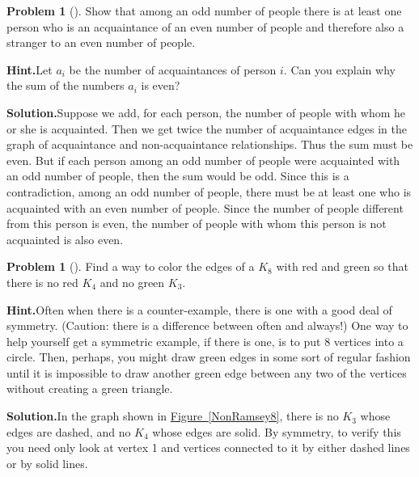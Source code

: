 \documentclass[10pt,]{book}
\theoremstyle{plain}
\theoremstyle{definition}
\newtheorem{activity}[project]{Problem}
\theoremstyle{definition}
\numberwithin{equation}{chapter}
\begin{document}
\begin{activity}[]\label{OddNoPeople}
Show that among an odd number of people there is at least one person who is an acquaintance of an even number of people and therefore also a stranger to an even number of people.%
\par\medskip\noindent%
\textbf{Hint.}\quad Let \(a_i\) be the number of acquaintances of person \(i\). Can you explain why the sum of the numbers \(a_i\) is even?%
\par\medskip\noindent%
\textbf{Solution.}\quad Suppose we add, for each person, the number of people with whom he or she is acquainted. Then we get twice the number of acquaintance edges in the graph of acquaintance and non-acquaintance relationships. Thus the sum must be even. But if each person among an odd number of people were acquainted with an odd number of people, then the sum would be odd. Since this is a contradiction, among an odd number of people, there must be at least one who is acquainted with an even number of people. Since the number of people different from this person is even, the number of people with whom this person is not acquainted is also even.%
\end{activity}
\begin{activity}[]\label{R_4_3_not8}
Find a way to color the edges of a \(K_8\) with red and green so that there is no red \(K_4\) and no green \(K_3\).%
\par\medskip\noindent%
\textbf{Hint.}\quad Often when there is a counter-example, there is one with a good deal of symmetry. (Caution: there is a difference between often and always!) One way to help yourself get a symmetric example, if there is one, is to put 8 vertices into a circle. Then, perhaps, you might draw green edges in some sort of regular fashion until it is impossible to draw another green edge between any two of the vertices without creating a green triangle.%
\par\medskip\noindent%
\textbf{Solution.}\quad In the graph shown in \hyperref[NonRamsey8]{Figure~\ref{NonRamsey8}}, there is no \(K_3\) whose edges are dashed, and no \(K_4\) whose edges are solid. By symmetry, to verify this you need only look at vertex 1 and vertices connected to it by either dashed lines or by solid lines.%
\end{activity}
\end{document}
